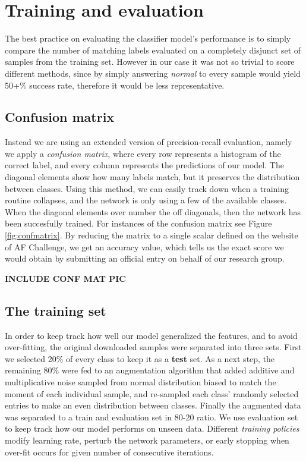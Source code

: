 \chapter{Training and evaluation}

The best practice on evaluating the classifier model's performance is to simply compare the number of matching labels evaluated on a completely disjunct set of samples from the training set.
However in our case it was not so trivial to score different methods, since by simply answering \textit{normal} to every sample would yield 50+\% success rate, therefore it would be less representative.

\section{Confusion matrix}
Instead we are using an extended version of precision-recall evaluation, namely we apply a \textit{confusion matrix}, where every row represents a histogram of the correct label, and every column represents the predictions of our model. The diagonal elements show how many labels match, but it preserves the distribution between classes.
Using this method, we can easily track down when a training routine collapses, and the network is only using a few of the available classes. When the diagonal elements over number the off diagonals, then the network has been succesfully trained. For instances of the confusion matrix see Figure \ref{fig:confmatrix}.
By reducing the matrix to a single scalar defined on the website of AF Challenge, we get an accuracy value, which tells us the exact score we would obtain by submitting an official entry on behalf of our research group.

\textbf{INCLUDE CONF MAT PIC}

\section{The training set}
In order to keep track how well our model generalized the features, and to avoid over-fitting, the original downloaded samples were separated into three sets.
First we selected 20\% of every class to keep it as a \textbf{test} set.
As a next step, the remaining 80\% were fed to an augmentation algorithm that added additive and multiplicative noise sampled from normal distribution biased to match the moment of each individual sample, and re-sampled each class' randomly selected entries to make an even distribution between classes.
Finally the augmented data was separated to a train and evaluation set in 80-20 ratio.
We use evaluation set to keep track how our model performs on unseen data.
Different \textit{training policies} modify learning rate, perturb the network parameters, or early stopping when over-fit occurs for given number of consecutive iterations.

